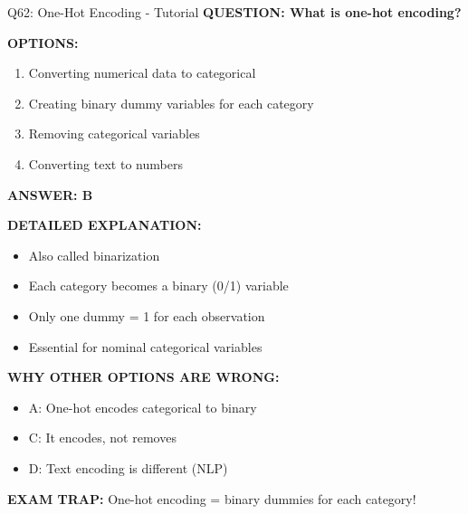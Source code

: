 \documentclass[8pt]{beamer}
\begin{document}
	\begin{frame}{Q62: One-Hot Encoding - Tutorial}
		\fontsize{6.5}{7.5}\selectfont
		\textbf{QUESTION: What is one-hot encoding?}
		
		\vspace{0.1cm}
		\textbf{OPTIONS:}
		\begin{enumerate}
			\item Converting numerical data to categorical
			\item Creating binary dummy variables for each category
			\item Removing categorical variables
			\item Converting text to numbers
		\end{enumerate}
		
		\vspace{0.1cm}
		\textcolor{myblue}{\textbf{ANSWER: B}}
		
		\vspace{0.1cm}
		\textbf{DETAILED EXPLANATION:}
		\begin{itemize}
			\item Also called binarization
			\item Each category becomes a binary (0/1) variable
			\item Only one dummy = 1 for each observation
			\item Essential for nominal categorical variables
		\end{itemize}
		
		\vspace{0.1cm}
		\textcolor{myred}{\textbf{WHY OTHER OPTIONS ARE WRONG:}}
		\begin{itemize}
			\item \textcolor{myred}{A:} One-hot encodes categorical to binary
			\item \textcolor{myred}{C:} It encodes, not removes
			\item \textcolor{myred}{D:} Text encoding is different (NLP)
		\end{itemize}
		
		\textcolor{myred}{\textbf{EXAM TRAP:}} One-hot encoding = \textcolor{myblue}{binary dummies for each category}!
	\end{frame}
	
\end{document}
